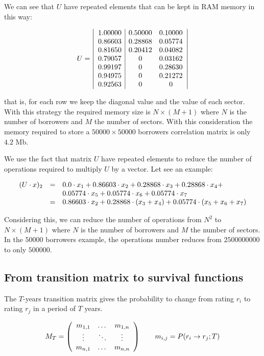 \documentclass[a4paper,12pt,final]{article}
\begin{document}
We can see that $U$ have repeated elements that can be kept in RAM memory in 
this way:

\begin{displaymath}
U = \left|
\begin{array}{c|cc}
 1.00000 & 0.50000 & 0.10000 \cr
 0.86603 & 0.28868 & 0.05774 \cr
 0.81650 & 0.20412 & 0.04082 \cr
 0.79057 & 0       & 0.03162 \cr
 0.99197 & 0       & 0.28630 \cr
 0.94975 & 0       & 0.21272 \cr
 0.92563 & 0       & 0
\end{array}
\right|
\end{displaymath}

that is, for each row we keep the diagonal value and the value of each sector. 
With this strategy the required memory size is $N \times (M+1)$ where $N$ is
the number of borrowers and $M$ the number of sectors. With this consideration
the memory required to store a $50000 \times 50000$ borrowers correlation matrix
is only $4.2$ Mb.
\newline

We use the fact that matrix $U$ have repeated elements to reduce the number of 
operations required to multiply $U$ by a vector. Let see an example:

\begin{displaymath}
\begin{array}{rcl}
(U \cdot x)_2 & = & 0.0 \cdot x_1 + 0.86603 \cdot x_2 + 0.28868 \cdot x_3 + 0.28868 \cdot x_4 + \cr
              &   & 0.05774 \cdot x_5 + 0.05774 \cdot x_6 + 0.05774 \cdot x_7 \cr
              & = & 0.86603 \cdot x_2 + 0.28868 \cdot (x_3 + x_4) + 0.05774 \cdot (x_5 + x_6 + x_7)
\end{array}
\end{displaymath}

Considering this, we can reduce the number of operations from $N^2$ to 
$N \times (M+1)$ where $N$ is the number of borrowers and $M$ the number of 
sectors. In the $50000$ borrowers example, the operations number reduces from 
$2500000000$ to only $500000$.

\subsection{From transition matrix to survival functions}
\label{ap:tmatrix}
The $T$-years transition matrix gives the probability to change from rating $r_i$ 
to rating $r_j$ in a period of $T$ years.

\begin{displaymath}
M_T = \left(
\begin{array}{ccc}
m_{1,1} & \dots  & m_{1,n} \cr
\vdots & \ddots & \vdots \cr
m_{n,1} & \dots  & m_{n,n} 
\end{array}
\right)
\qquad
m_{i,j} = P(r_i \to r_j;T)
\end{displaymath}
\end{document}
